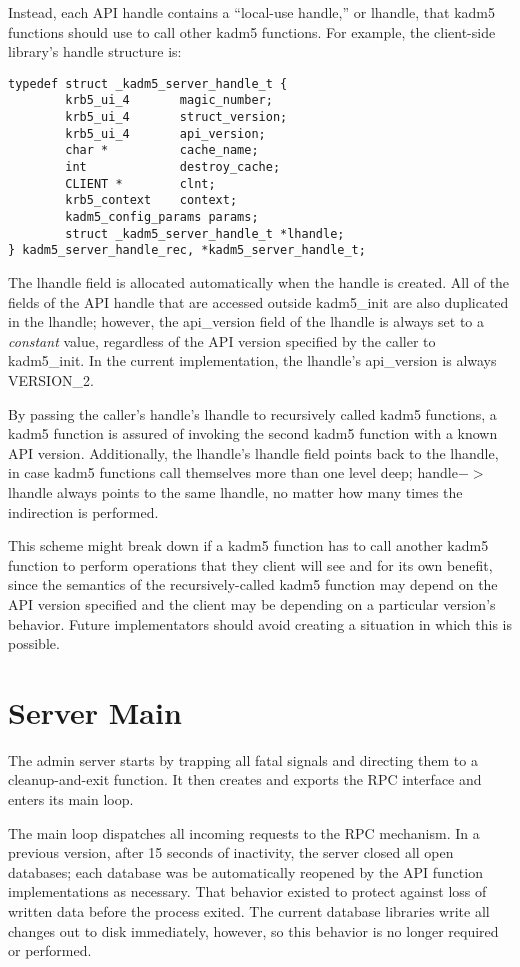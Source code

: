 Instead, each API handle contains a ``local-use handle,'' or lhandle,
that kadm5 functions should use to call other kadm5 functions.  For
example, the client-side library's handle structure is:
%
\begin{verbatim}
typedef struct _kadm5_server_handle_t {
        krb5_ui_4       magic_number;
        krb5_ui_4       struct_version;
        krb5_ui_4       api_version;
        char *          cache_name;
        int             destroy_cache;
        CLIENT *        clnt;
        krb5_context    context;
        kadm5_config_params params;
        struct _kadm5_server_handle_t *lhandle;
} kadm5_server_handle_rec, *kadm5_server_handle_t;
\end{verbatim}
%
The lhandle field is allocated automatically when the handle is
created.  All of the fields of the API handle that are accessed
outside kadm5_init are also duplicated in the lhandle; however, the
api_version field of the lhandle is always set to a {\it constant}
value, regardless of the API version specified by the caller to
kadm5_init.  In the current implementation, the lhandle's api_version
is always VERSION_2.

By passing the caller's handle's lhandle to recursively called kadm5
functions, a kadm5 function is assured of invoking the second kadm5
function with a known API version.  Additionally, the lhandle's
lhandle field points back to the lhandle, in case kadm5 functions call
themselves more than one level deep; handle$->$lhandle always points
to the same lhandle, no matter how many times the indirection is
performed.

This scheme might break down if a kadm5 function has to call another
kadm5 function to perform operations that they client will see and for
its own benefit, since the semantics of the recursively-called kadm5
function may depend on the API version specified and the client may be
depending on a particular version's behavior.  Future implementators
should avoid creating a situation in which this is possible.

\section{Server Main}

The admin server starts by trapping all fatal signals and directing
them to a cleanup-and-exit function.  It then creates and exports the
RPC interface and enters its main loop.

The main loop dispatches all incoming requests to the RPC mechanism.
In a previous version, after 15 seconds of inactivity, the server
closed all open databases; each database was be automatically reopened
by the API function implementations as necessary.  That behavior
existed to protect against loss of written data before the process
exited.  The current database libraries write all changes out to disk
immediately, however, so this behavior is no longer required or
performed.

